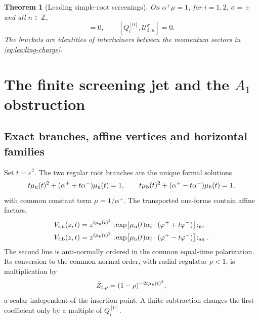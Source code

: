 \documentclass[11pt,a4paper]{article}
\numberwithin{equation}{section}
\newtheorem{theorem}{Theorem}[section]
\theoremstyle{remark}
\newcommand{\cU}{\mathcal U}
\newcommand{\eps}{\varepsilon}
\begin{document}
\begin{theorem}[Leading simple-root screenings]
\label{thm:leading}
On $\alpha^+\mu=1$, for $i=1,2$, $\sigma=\pm$ and all $n\in\mathbb Z$,
\begin{equation}
 [Q_i^{[0]},U_{2,n}^{\sigma}]=0,
 \qquad
 [Q_i^{[0]},\cU_{3,n}^{\sigma}]=0.
 \label{eq:leading-theorem}
\end{equation}
The brackets are identities of intertwiners between the momentum sectors in
\cref{eq:leading-charge}.
\end{theorem}

\section{The finite screening jet and the \texorpdfstring{$A_1$}{A1} obstruction}
\label{sec:jet}

\subsection{Exact branches, affine vertices and horizontal families}

Set $t=\eps^2$.  The two regular root branches are the unique formal solutions
\begin{equation}
 t\mu_{\rm u}(t)^2+(\alpha^++t\alpha^-)\mu_{\rm u}(t)=1,
 \qquad
 t\mu_{\rm b}(t)^2+(\alpha^+-t\alpha^-)\mu_{\rm b}(t)=1,
 \label{eq:regular-branches}
\end{equation}
with common constant term $\mu=1/\alpha^+$.  The transported one-forms contain affine
factors,
\begin{align}
 V_{i,\rm u}(z,t)&=z^{t\mu_{\rm u}(t)^2}
 :\!\exp\!\left[\mu_{\rm u}(t)\alpha_i\cdot(\varphi^++t\varphi^-)\right]\!:
 _{\rm n},
 \label{eq:unbarred-affine-vertex}\\
 V_{i,\rm b}(z,t)&=z^{t\mu_{\rm b}(t)^2}
 :\!\exp\!\left[\mu_{\rm b}(t)\alpha_i\cdot(\varphi^+-t\varphi^-)\right]\!:
 _{\rm an}.
 \label{eq:barred-affine-vertex}
\end{align}
The second line is anti-normally ordered in the common equal-time polarization.  Its conversion
to the common normal order, with radial regulator $\rho<1$, is multiplication by
\begin{equation}
 \bar Z_{t,\rho}=(1-\rho)^{-2t\mu_{\rm b}(t)^2},
 \label{eq:bch-factor}
\end{equation}
a scalar independent of the insertion point.  A finite subtraction changes the first
coefficient only by a multiple of $Q_i^{[0]}$.
\end{document}
